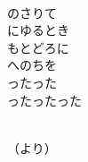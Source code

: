 \documentclass[10pt,b5j]{tarticle} %
\begin{document}
\begin{enumerate}
\begin{minipage}[c]{\blocksize}
        \vspace{\linespace}
        \item~\\
        のさりて\\
        にゆるとき\\
        もとどろに\\
        へのちを\\
        ったった\\
        ったったった
        
        
    \end{minipage}
    \begin{minipage}[c]{\blocksize}
        
        \vspace{\linespace}
        \item~\\
        （より）
    
    \end{minipage}
\end{enumerate} %
\end{document}
